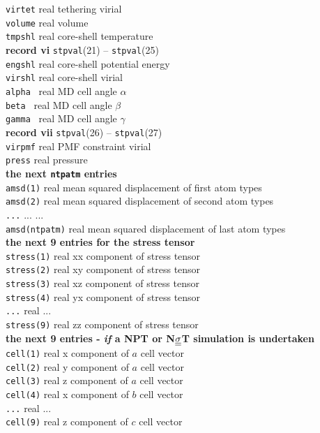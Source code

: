 \begin{tabbing}
\> {\tt virtet} \> real    \> tethering virial \\
\> {\tt volume} \> real    \> volume \\
\> {\tt tmpshl} \> real    \> core-shell temperature \\
{\bf record vi} {\tt stpval}(21) -- {\tt stpval}(25) \\
\> {\tt engshl} \> real    \> core-shell potential energy \\
\> {\tt virshl} \> real    \> core-shell virial \\
\> {\tt alpha } \> real    \> MD cell angle $\alpha$ \\
\> {\tt beta }  \> real    \> MD cell angle $\beta$ \\
\> {\tt gamma } \> real    \> MD cell angle $\gamma$ \\
{\bf record vii} {\tt stpval}(26) -- {\tt stpval}(27) \\
\> {\tt virpmf} \> real    \> PMF constraint virial \\
\> {\tt press}  \> real    \> pressure \\
{\bf the next {\tt ntpatm} entries} \\
\> {\tt amsd(1)} \> real   \> mean squared displacement of first atom types \\
\> {\tt amsd(2)} \> real   \> mean squared displacement of second atom types \\
\> {\tt ...} \> ... \> ... \\
\> {\tt amsd(ntpatm)} \> real \> mean squared displacement of last atom types \\
{\bf the next 9 entries for the stress tensor} \\
\> {\tt stress(1)} \> real \> xx component of stress tensor \\
\> {\tt stress(2)} \> real \> xy component of stress tensor \\
\> {\tt stress(3)} \> real \> xz component of stress tensor \\
\> {\tt stress(4)} \> real \> yx component of stress tensor \\
\> {\tt ...} \> real \> ... \\
\> {\tt stress(9)} \> real \> zz component of stress tensor \\
{\bf the next 9 entries - {\em if} a NPT or N$\mbox{$\underline{\underline{\bf \sigma}}$}$T simulation is undertaken} \\
\> {\tt cell(1)} \> real   \> x component of $a$ cell vector \\
\> {\tt cell(2)} \> real   \> y component of $a$ cell vector \\
\> {\tt cell(3)} \> real   \> z component of $a$ cell vector \\
\> {\tt cell(4)} \> real   \> x component of $b$ cell vector \\
\> {\tt ...} \> real \> ... \\
\> {\tt cell(9)} \> real   \> z component of $c$ cell vector
\end{tabbing}
